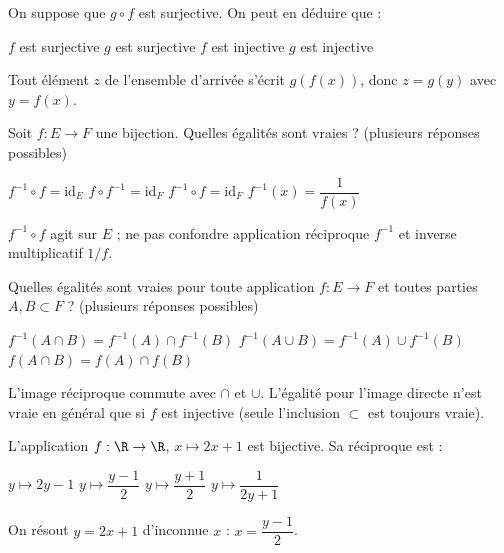 \begin{question}
On suppose que $g\circ f$ est surjective. On peut en déduire que :
\begin{reponses}
  \mauvaise $f$ est surjective
  \bonne $g$ est surjective
  \mauvaise $f$ est injective
  \mauvaise $g$ est injective
\end{reponses}
\begin{explication}
Tout élément $z$ de l'ensemble d'arrivée s'écrit $g(f(x))$, donc $z=g(y)$ avec $y=f(x)$.
\end{explication}
\end{question}

\begin{question}
Soit $f:E\to F$ une bijection. Quelles égalités sont vraies ? (plusieurs réponses possibles)
\begin{reponses}
  \bonne $f^{-1}\circ f=\mathrm{id}_E$
  \bonne $f\circ f^{-1}=\mathrm{id}_F$
  \mauvaise $f^{-1}\circ f=\mathrm{id}_F$
  \mauvaise $f^{-1}(x)=\dfrac{1}{f(x)}$
\end{reponses}
\begin{explication}
$f^{-1}\circ f$ agit sur $E$ ; ne pas confondre application réciproque $f^{-1}$ et inverse multiplicatif $1/f$.
\end{explication}
\end{question}

\begin{question}
Quelles égalités sont vraies pour toute application $f:E\to F$ et toutes parties $A,B\subset F$ ? (plusieurs réponses possibles)
\begin{reponses}
  \bonne $f^{-1}(A\cap B)=f^{-1}(A)\cap f^{-1}(B)$
  \bonne $f^{-1}(A\cup B)=f^{-1}(A)\cup f^{-1}(B)$
  \mauvaise $f(A\cap B)=f(A)\cap f(B)$
\end{reponses}
\begin{explication}
L'image réciproque commute avec $\cap$ et $\cup$. L'égalité pour l'image directe n'est vraie en général que si $f$ est injective (seule l'inclusion $\subset$ est toujours vraie).
\end{explication}
\end{question}

\begin{question}
L'application $f:\R\to\R$, $x\mapsto 2x+1$ est bijective. Sa réciproque est :
\begin{reponses}
  \mauvaise $y\mapsto 2y-1$
  \bonne $y\mapsto \dfrac{y-1}{2}$
  \mauvaise $y\mapsto \dfrac{y+1}{2}$
  \mauvaise $y\mapsto \dfrac{1}{2y+1}$
\end{reponses}
\begin{explication}
On résout $y=2x+1$ d'inconnue $x$ : $x=\dfrac{y-1}{2}$.
\end{explication}
\end{question}
